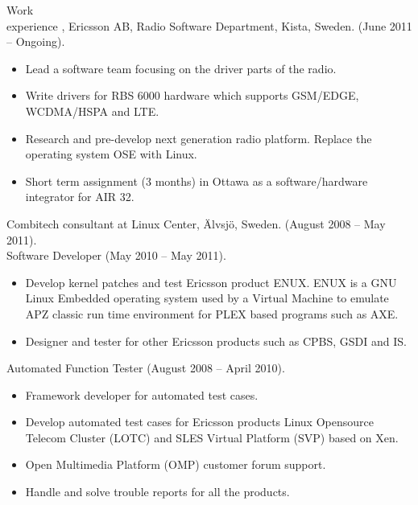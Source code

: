 \documentclass{../../cls/cv}
\author{Samuel Gabrielsson - Curriculum Vitae}
\begin{document}
\maketitle

\begin{category}{Work \\experience}
, Ericsson AB, Radio Software Department, Kista, Sweden. (June 2011 -- Ongoing).
\begin{itemize}
   \item Lead a software team focusing on the driver parts of the radio.
   \item Write drivers for RBS 6000 hardware which supports GSM/EDGE, WCDMA/HSPA and LTE.
   \item Research and pre-develop next generation radio platform. Replace the operating system OSE with Linux.
   \item Short term assignment (3 months) in Ottawa as a software/hardware integrator for AIR 32.
\end{itemize}

 Combitech consultant at Linux Center, \"Alvsj\"o, Sweden. (August 2008 -- May 2011).\\
Software Developer (May 2010 -- May 2011).
\begin{itemize}
   \item Develop kernel patches and test Ericsson product ENUX. ENUX is a GNU Linux Embedded operating system used by a Virtual Machine to emulate APZ classic run time environment for PLEX based programs such as AXE.
   \item Designer and tester for other Ericsson products such as CPBS, GSDI and IS.
\end{itemize}
Automated Function Tester (August 2008 -- April 2010).
\begin{itemize}
   \item Framework developer for automated test cases.
   \item Develop automated test cases for Ericsson products Linux Opensource Telecom Cluster (LOTC) and SLES Virtual Platform (SVP) based on Xen.
   \item Open Multimedia Platform (OMP) customer forum support.
   \item Handle and solve trouble reports for all the products.
\end{itemize}



\end{category}
\end{document}
